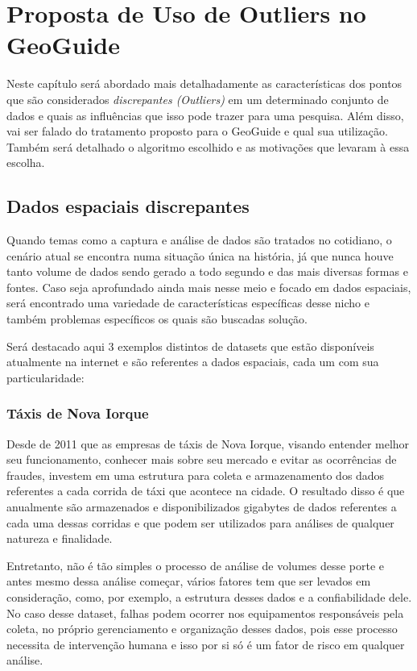 \chapter{Proposta de Uso de Outliers no GeoGuide}
\label{chap:outliers}

Neste capítulo será abordado mais detalhadamente as características dos pontos que são considerados \textit{discrepantes (Outliers)}  em um determinado conjunto de dados e quais as influências que isso pode trazer para uma pesquisa. Além disso, vai ser falado do tratamento proposto para o GeoGuide e qual sua utilização. Também será detalhado o algoritmo escolhido e as motivações que levaram à essa escolha.

\section{Dados espaciais discrepantes}

Quando temas como a captura e análise de dados são tratados no cotidiano, o cenário atual se encontra numa situação única na história, já que nunca houve tanto volume de dados sendo gerado a todo segundo e das mais diversas formas e fontes. Caso seja aprofundado ainda mais nesse meio e focado em dados espaciais, será encontrado uma variedade de características específicas desse nicho e também problemas específicos os quais são buscadas solução.

Será destacado aqui 3 exemplos distintos de datasets que estão disponíveis atualmente na internet e são referentes a dados espaciais, cada um com sua particularidade:

\subsection{Táxis de Nova Iorque}

Desde de 2011 que as empresas de táxis de Nova Iorque, visando entender melhor seu funcionamento, conhecer mais sobre seu mercado e evitar as ocorrências de fraudes, investem em uma estrutura para coleta e armazenamento dos dados referentes a cada corrida de táxi que acontece na cidade. O resultado disso é que anualmente são armazenados e disponibilizados gigabytes de dados referentes a cada uma dessas corridas e que podem ser utilizados para análises de qualquer natureza e finalidade.

Entretanto, não é tão simples o processo de análise de volumes desse porte e antes mesmo dessa análise começar, vários fatores tem que ser levados em consideração, como, por exemplo, a estrutura desses dados e a confiabilidade dele. No caso desse dataset, falhas podem ocorrer nos equipamentos responsáveis pela coleta, no próprio gerenciamento e organização desses dados, pois esse processo necessita de intervenção humana e isso por si só é um fator de risco em qualquer análise.

